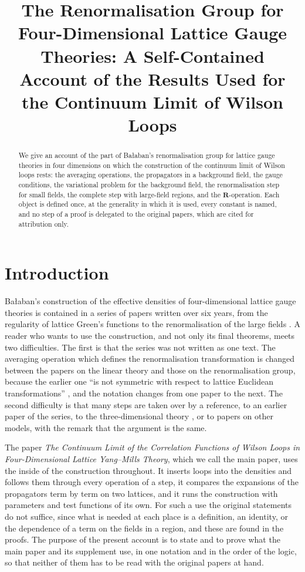 \documentclass[11pt]{preprint}
\title{The Renormalisation Group for Four-Dimensional Lattice Gauge Theories: A Self-Contained Account of the Results Used for the Continuum Limit of Wilson Loops}
\author{}
\date{}
\numberwithin{equation}{section}
\begin{document}
\maketitle

\begin{abstract}
We give an account of the part of Ba{\l}aban's renormalisation group for lattice gauge theories in four dimensions on which the construction of the continuum limit of Wilson loops rests: the averaging operations, the propagators in a background field, the gauge conditions, the variational problem for the background field, the renormalisation step for small fields, the complete step with large-field regions, and the $\mathbf R$-operation. Each object is defined once, at the generality in which it is used, every constant is named, and no step of a proof is delegated to the original papers, which are cited for attribution only.
\end{abstract}

\setcounter{tocdepth}{2}
{\setlength{\parskip}{0pt}\tableofcontents}

\setcounter{section}{-1}
\section{Introduction}\label{sec:introduction}

Ba{\l}aban's construction of the effective densities of four-dimensional lattice gauge theories is contained in a series of papers written over six years, from the regularity of lattice Green's functions \cite{BalabanRDG} to the renormalisation of the large fields \cite{BalabanLFR1,BalabanLFR2}. A reader who wants to use the construction, and not only its final theorems, meets two difficulties. The first is that the series was not written as one text. The averaging operation which defines the renormalisation transformation is changed between the papers on the linear theory and those on the renormalisation group, because the earlier one ``is not symmetric with respect to lattice Euclidean transformations'' \cite[p.~252]{BalabanRG1}, and the notation changes from one paper to the next. The second difficulty is that many steps are taken over by a reference, to an earlier paper of the series, to the three-dimensional theory \cite{BalabanUV3}, or to papers on other models, with the remark that the argument is the same.

The paper \emph{The Continuum Limit of the Correlation Functions of Wilson Loops in Four-Dimensional Lattice Yang--Mills Theory}, which we call the main paper, uses the inside of the construction throughout. It inserts loops into the densities and follows them through every operation of a step, it compares the expansions of the propagators term by term on two lattices, and it runs the construction with parameters and test functions of its own. For such a use the original statements do not suffice, since what is needed at each place is a definition, an identity, or the dependence of a term on the fields in a region, and these are found in the proofs. The purpose of the present account is to state and to prove what the main paper and its supplement use, in one notation and in the order of the logic, so that neither of them has to be read with the original papers at hand.
\end{document}

